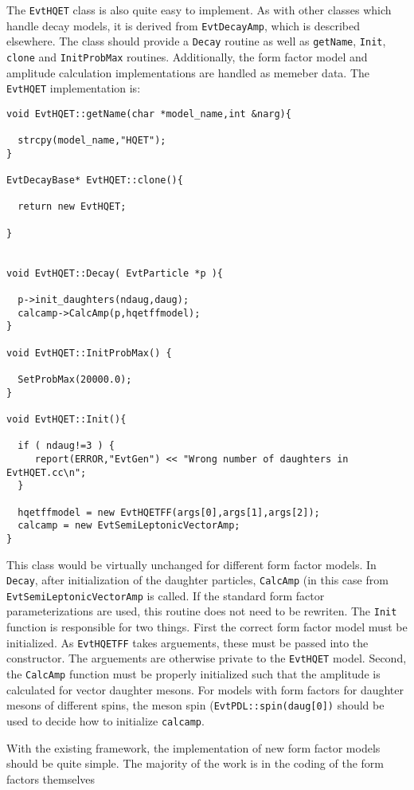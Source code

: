 \documentclass[6pt]{article}
\begin{document}
\noindent The {\tt EvtHQET} class is also quite easy to
implement.  As with other classes which handle decay
models, it is derived from {\tt EvtDecayAmp}, which
is described elsewhere.  The class
should provide a {\tt Decay} routine as well as 
{\tt getName}, {\tt Init}, {\tt clone} 
and {\tt InitProbMax} routines.  Additionally,
the form factor model and amplitude calculation 
implementations are handled as memeber data.  The
{\tt EvtHQET} implementation is:
\begin{verbatim}
void EvtHQET::getName(char *model_name,int &narg){

  strcpy(model_name,"HQET");
}

EvtDecayBase* EvtHQET::clone(){

  return new EvtHQET;

}


void EvtHQET::Decay( EvtParticle *p ){

  p->init_daughters(ndaug,daug);
  calcamp->CalcAmp(p,hqetffmodel);
}

void EvtHQET::InitProbMax() {

  SetProbMax(20000.0);
}

void EvtHQET::Init(){

  if ( ndaug!=3 ) {
     report(ERROR,"EvtGen") << "Wrong number of daughters in EvtHQET.cc\n";
  }

  hqetffmodel = new EvtHQETFF(args[0],args[1],args[2]);
  calcamp = new EvtSemiLeptonicVectorAmp;
}
\end{verbatim}
This class would be virtually unchanged for different
form factor models.  In {\tt Decay}, after initialization
of the daughter particles, {\tt CalcAmp} (in this case
from {\tt EvtSemiLeptonicVectorAmp} is called.  If the
standard form factor parameterizations are used, this
routine does not need to be rewriten.  The {\tt Init}
function is responsible for two things.  First the correct
form factor model must be initialized.  As {\tt EvtHQETFF}
takes arguements, these must be passed into
the constructor.  The arguements are otherwise private to the
{\tt EvtHQET} model.  Second, the {\tt CalcAmp} function
must be properly initialized such that the amplitude
is calculated for vector daughter mesons.  For models with form
factors for daughter mesons of different spins, the meson
spin ({\tt EvtPDL::spin(daug[0])} should be used to decide 
how to initialize {\tt calcamp}.

\noindent With the existing framework, the implementation of
new form factor models should be quite simple.  The majority of
the work is in the coding of the form factors themselves
\end{document}
